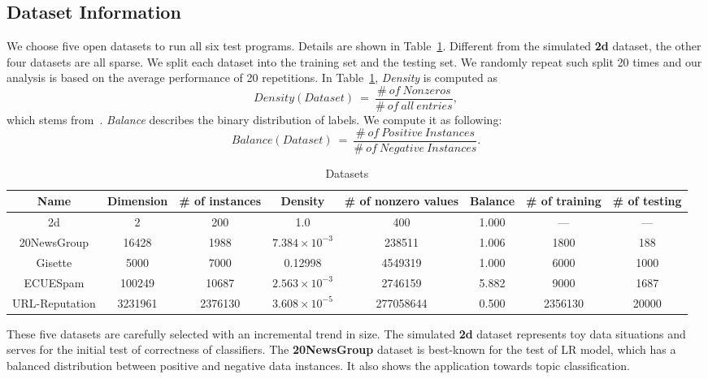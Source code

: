 \documentclass[10pt, conference, compsocconf]{IEEEtran}
\begin{document}
\subsection{Dataset Information}
We choose five open datasets to run all six test programs. Details are shown in Table~\ref{tab:table1}.	
Different from the simulated \textbf{2d} dataset, the other four datasets are all sparse.
We split each dataset into the training set and the testing set. We randomly repeat such split 20 times and our analysis is based on the average performance of 20 repetitions. In Table~\ref{tab:table1}, \textit{Density} is computed as
\[
Density(Dataset)~=~\frac{\#~of~Nonzeros}{\#~of~all~entries},
\]
which stems from~\cite{sarwar2001item}.
\textit{Balance} describes the binary distribution of labels.
We compute it as following:
\[
Balance(Dataset)~=~\frac{\#~of~Positive~Instances}{\#~of~Negative~Instances}.
\]
\begin{table}%
\centering
\caption{Datasets}\label{tab:table1}\vspace{-0.3cm}
\begin{tabular}{|c|c|c|c|c|c|c|c|}
\hline
    Name           & Dimension & \# of instances & Density  & \# of nonzero values & Balance & \# of training & \# of testing\\
\hline
    2d             & 2             & 200            & 1.0                      & 400          & 1.000 & --- & --- \\
\hline
    20NewsGroup    & 16428         & 1988           & $7.384\times10^{-3}$     & 238511          & 1.006 & 1800 & 188\\
\hline
    Gisette        & 5000          & 7000           & 0.12998                  & 4549319          & 1.000 & 6000 & 1000\\
\hline
    ECUESpam       & 100249        & 10687          & $2.563\times10^{-3}$     & 2746159          & 5.882 & 9000 & 1687\\
\hline
    URL-Reputation & 3231961       & 2376130        & $3.608\times10^{-5}$     & 277058644          & 0.500 & 2356130 & 20000\\
\hline
\end{tabular}\vspace{-0.3cm}
\end{table}
These five datasets are carefully selected with an incremental trend in size.
The simulated \textbf{2d} dataset represents toy data situations and serves for the initial test of correctness of classifiers.
The \textbf{20NewsGroup} dataset is best-known for the test of LR model, which has a balanced distribution between positive and negative data instances. It also shows the application towards topic classification.
\end{document}
